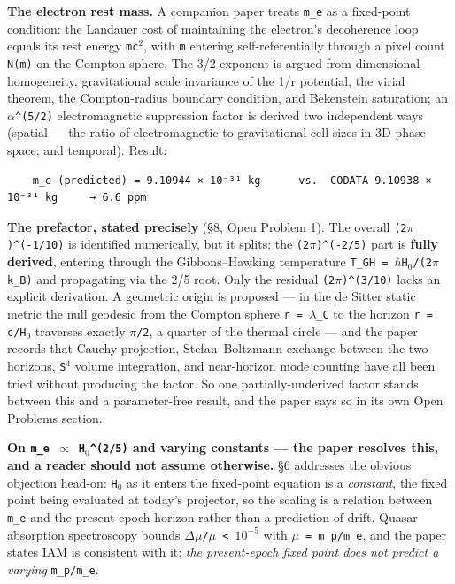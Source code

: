 \documentclass[12pt,a4paper]{article}
\begin{document}
\textbf{The electron rest mass.} A companion paper treats \texttt{m\_e} as a fixed-point condition: the Landauer cost of maintaining the electron's decoherence loop equals its rest energy \texttt{mc$^{2}$}, with \texttt{m} entering self-referentially through a pixel count \texttt{N(m)} on the Compton sphere. The 3/2 exponent is argued from dimensional homogeneity, gravitational scale invariance of the 1/r potential, the virial theorem, the Compton-radius boundary condition, and Bekenstein saturation; an \texttt{$\alpha$\textasciicircum{}(5/2)} electromagnetic suppression factor is derived two independent ways (spatial --- the ratio of electromagnetic to gravitational cell sizes in 3D phase space; and temporal). Result:


\begin{lstlisting}
    m_e (predicted) = 9.10944 × 10⁻³¹ kg      vs.  CODATA 9.10938 × 10⁻³¹ kg     → 6.6 ppm
\end{lstlisting}


\textbf{The prefactor, stated precisely} (\S8, Open Problem 1). The overall \texttt{(2$\pi$)\textasciicircum{}(-1/10)} is identified numerically, but it splits: the \texttt{(2$\pi$)\textasciicircum{}(-2/5)} part is \textbf{fully derived}, entering through the Gibbons--Hawking temperature \texttt{T\_GH = $\hbar$H$_{0}$/(2$\pi$k\_B)} and propagating via the 2/5 root. Only the residual \texttt{(2$\pi$)\textasciicircum{}(3/10)} lacks an explicit derivation. A geometric origin is proposed --- in the de Sitter static metric the null geodesic from the Compton sphere \texttt{r = $\lambda$\_C} to the horizon \texttt{r = c/H$_{0}$} traverses exactly \texttt{$\pi$/2}, a quarter of the thermal circle --- and the paper records that Cauchy projection, Stefan--Boltzmann exchange between the two horizons, \texttt{S$^{4}$} volume integration, and near-horizon mode counting have all been tried without producing the factor. So one partially-underived factor stands between this and a parameter-free result, and the paper says so in its own Open Problems section.


\textbf{On \texttt{m\_e $\propto$ H$_{0}$\textasciicircum{}(2/5)} and varying constants --- the paper resolves this, and a reader should not assume otherwise.} \S6 addresses the obvious objection head-on: \texttt{H$_{0}$} as it enters the fixed-point equation is a \textit{constant}, the fixed point being evaluated at today's projector, so the scaling is a relation between \texttt{m\_e} and the present-epoch horizon rather than a prediction of drift. Quasar absorption spectroscopy bounds \texttt{$\Delta\mu$/$\mu$ < $10^{-5}$} with \texttt{$\mu$ = m\_p/m\_e}, and the paper states IAM is consistent with it: \textit{the present-epoch fixed point does not predict a varying} \texttt{m\_p/m\_e}.
\end{document}

